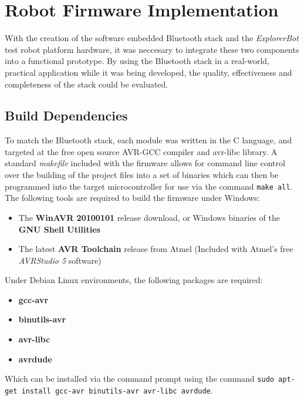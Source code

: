 \chapter{Robot Firmware Implementation}
\label{Chapter 5}

With the creation of the software embedded Bluetooth stack and the \textit{ExplorerBot} test robot platform hardware, it was neccesary to integrate these two components into a functional prototype. By using the Bluetooth stack in a real-world, practical application while it was being developed, the quality, effectiveness and completeness of the stack could be evaluated.

\section{Build Dependencies}

To match the Bluetooth stack, each module was written in the C language, and targeted at the free open source AVR-GCC compiler and avr-libc library. A standard \textit{makefile} included with the firmware allows for command line control over the building of the project files into a set of binaries which can then be programmed into the target microcontroller for use via the command \texttt{make all}. The following tools are required to build the firmware under Windows:

\begin{itemize}
	\item The \textbf{WinAVR 20100101} release download, or Windows binaries of the \textbf{GNU Shell Utilities}
	\item The latest \textbf{AVR Toolchain} release from Atmel (Included with Atmel's free \textit{AVRStudio 5} software)
\end{itemize}

Under Debian Linux environments, the following packages are required:

\begin{itemize}
	\item \textbf{gcc-avr} 
	\item \textbf{binutils-avr}
	\item \textbf{avr-libc}
	\item \textbf{avrdude}
\end{itemize}

Which can be installed via the command prompt using the command \texttt{sudo apt-get install gcc-avr binutils-avr avr-libc avrdude}.

